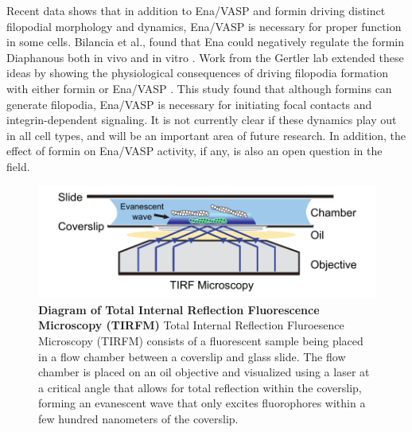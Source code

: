 Recent data shows that in addition to Ena/VASP and formin driving distinct filopodial morphology and dynamics, Ena/VASP is necessary for proper function in some cells. Bilancia et al., found that Ena could negatively regulate the formin Diaphanous both in vivo and in vitro \citep{bilancia_enabled_2014}. Work from the Gertler lab extended these ideas by showing the physiological consequences of driving filopodia formation with either formin or Ena/VASP \citep{barzik_ena/vasp_2005}. This study found that although formins can generate filopodia, Ena/VASP is necessary for initiating focal contacts and integrin-dependent signaling. It is not currently clear if these dynamics play out in all cell types, and will be an important area of future research. In addition, the effect of formin on Ena/VASP activity, if any, is also an open question in the field.

\begin{figure}
\centering
\includegraphics[width=17cm]{img/ch01/tirf_thesis.pdf}
\caption[Diagram of Total Internal Reflection Fluorescence Microscopy (TIRFM)]{\textbf{Diagram of Total Internal Reflection Fluorescence Microscopy (TIRFM)} Total Internal Reflection Fluroesence Microscopy (TIRFM) consists of a fluorescent sample being placed in a flow chamber between a coverslip and glass slide. The flow chamber is placed on an oil objective and visualized using a laser at a critical angle that allows for total reflection within the coverslip, forming an evanescent wave that only excites fluorophores within a few hundred nanometers of the coverslip. }
\label{fig:tirf}
\end{figure}

